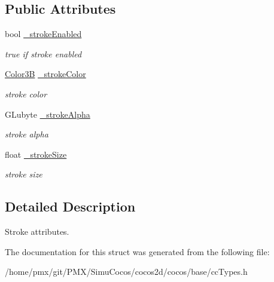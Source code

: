 \subsection*{Public Attributes}
\begin{DoxyCompactItemize}
\item 
\mbox{\label{structFontStroke_a3232754d75e4bef5fa50473106b36c2d}} 
bool \hyperlink{structFontStroke_a3232754d75e4bef5fa50473106b36c2d}{\+\_\+stroke\+Enabled}
\begin{DoxyCompactList}\small\item\em true if stroke enabled \end{DoxyCompactList}\item 
\mbox{\label{structFontStroke_a57ad206b7fa6004e8a1f8e83c31f3b4e}} 
\hyperlink{structColor3B}{Color3B} \hyperlink{structFontStroke_a57ad206b7fa6004e8a1f8e83c31f3b4e}{\+\_\+stroke\+Color}
\begin{DoxyCompactList}\small\item\em stroke color \end{DoxyCompactList}\item 
\mbox{\label{structFontStroke_abcec04a03e837e8364f8345c6a30d0c9}} 
G\+Lubyte \hyperlink{structFontStroke_abcec04a03e837e8364f8345c6a30d0c9}{\+\_\+stroke\+Alpha}
\begin{DoxyCompactList}\small\item\em stroke alpha \end{DoxyCompactList}\item 
\mbox{\label{structFontStroke_adc96e647551476831db79bce6d416fc2}} 
float \hyperlink{structFontStroke_adc96e647551476831db79bce6d416fc2}{\+\_\+stroke\+Size}
\begin{DoxyCompactList}\small\item\em stroke size \end{DoxyCompactList}\end{DoxyCompactItemize}


\subsection{Detailed Description}
Stroke attributes. 

The documentation for this struct was generated from the following file\+:\begin{DoxyCompactItemize}
\item 
/home/pmx/git/\+P\+M\+X/\+Simu\+Cocos/cocos2d/cocos/base/cc\+Types.\+h\end{DoxyCompactItemize}
